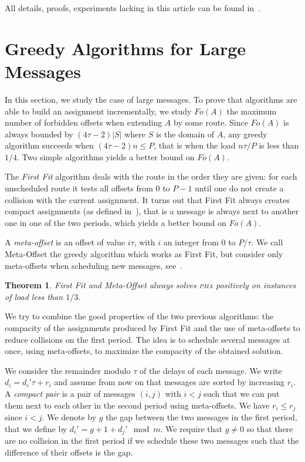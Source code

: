 \documentclass[10pt, conference, letterpaper]{algotel}
\newtheorem{theorem}{Theorem}
\newcommand\pma{\textsc{pma}\xspace}
\begin{document}
All details, proofs, experiments lacking in this article can be found in~\cite{}.

\section{Greedy Algorithms for Large Messages} \label{sec:large}

In this section, we study the case of large messages. To prove that algorithms are able to build an assignment incrementally, we study $Fo(A)$ the maximum number of forbidden offsets when extending $A$ by some route.
Since $Fo(A)$ is always bounded by $(4 \tau -2)|S|$ where $S$ is the domain of $A$, any greedy algorithm succeeds when $(4 \tau -2)n \leq P$, that is when the load $n\tau /P$ is less than $1/4$. Two simple algorithms yields a better bound on $Fo(A)$.

The \emph{First Fit} algorithm deals with the route in the order they are given:  for each unscheduled route it tests all offsets from $0$ to $P-1$ until one do not create a collision with the current assignment. It turns out that First Fit always creates compact assignments (as defined in~\cite{barth2018deterministic}), that is a message is always next to another one in one of the two periods, which yields a better bound on $Fo(A)$.

A \emph{meta-offset} is an offset of value $i\tau$, with $i$ an integer from $0$ to $P / \tau$. We call Meta-Offset the greedy algorithm which works as First Fit, but consider only meta-offsets when scheduling new messages, see~\cite{barth2018deterministic}.

\begin{theorem}
First Fit and Meta-Offset always solves \pma positively on instances of load less than $1/3$.
\end{theorem}

 We try to combine the good properties of the two previous algorithms: the compacity of the assignments produced by First Fit and the use of meta-offsets to reduce collisions on the first period. The idea is to schedule several messages at once, using meta-offsets, to maximize the compacity of the obtained solution. 

 We consider the remainder modulo $\tau$ of the delays of each message. We write $d_i = d_{i}'\tau + r_i$ and assume from now on that messages are sorted by increasing $r_i$. A \emph{compact pair} is a pair of messages $(i,j)$ with $i < j$ such that we can put them next to each other in the second period using meta-offsets.
We have $r_i \leq r_j$ since $i < j$. We denote by $g$ the gap between the two messages in the first period, that we define by $d_{i}' = g + 1 + d_{j}' \mod m$. We require that $g \neq 0$ so that there are no collision in the first period if we schedule these two messages such that the difference of their offsets is the gap. 
\end{document}
